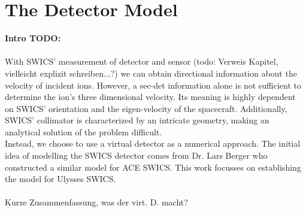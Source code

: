 \section{The Detector Model}

\textbf{Intro TODO:} \\ \\
With SWICS' measurement of detector and sensor (todo: Verweis Kapitel, vielleicht explizit schreiben...?) we can obtain directional information about the velocity of incident ions. However, a sec-det information alone is not sufficient to determine the ion's three dimensional velocity. Its meaning is highly dependent on SWICS' orientation and the eigen-velocity of the spacecraft. Additionally, SWICS' collimator is characterized by an intricate geometry, making an analytical solution of the problem difficult. \\
Instead, we choose to use a virtual detector as a numerical approach. The initial idea of modelling the SWICS detector comes from Dr. Lars Berger who constructed a similar model for ACE SWICS. This work focusses on establishing the model for Ulysses SWICS.\\ \\
Kurze Zusammenfassung, was der virt. D. macht?



